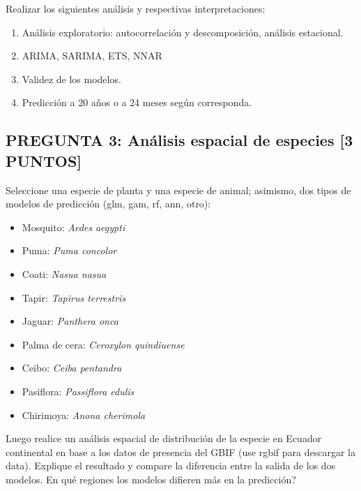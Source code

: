 \documentclass[
]{article}
\begin{document}
Realizar los siguientes análisis y respectivas interpretaciones:

\begin{enumerate}
\def\labelenumi{\arabic{enumi}.}
\item
  Análisis exploratorio: autocorrelación y descomposición, análisis
  estacional.
\item
  ARIMA, SARIMA, ETS, NNAR
\item
  Validez de los modelos.
\item
  Predicción a 20 años o a 24 meses según corresponda.
\end{enumerate}

\hypertarget{pregunta-3-anuxe1lisis-espacial-de-especies-3-puntos}{%
\subsection{\texorpdfstring{\textbf{PREGUNTA 3: Análisis espacial de
especies {[}3
PUNTOS{]}}}{PREGUNTA 3: Análisis espacial de especies {[}3 PUNTOS{]}}}\label{pregunta-3-anuxe1lisis-espacial-de-especies-3-puntos}}

Seleccione una especie de planta y una especie de animal; asimismo, dos
tipos de modelos de predicción (glm, gam, rf, ann, otro):

\begin{itemize}
\item
  Mosquito: \emph{Aedes aegypti}
\item
  Puma: \emph{Puma concolor}
\item
  Coati: \emph{Nasua nasua}
\item
  Tapir: \emph{Tapirus terrestris}
\item
  Jaguar: \emph{Panthera onca}
\item
  Palma de cera: \emph{Ceroxylon quindiuense}
\item
  Ceibo: \emph{Ceiba pentandra}
\item
  Pasiflora: \emph{Passiflora edulis}
\item
  Chirimoya: \emph{Anona cherimola}
\end{itemize}

Luego realice un análisis espacial de distribución de la especie en
Ecuador continental en base a los datos de presencia del GBIF (use rgbif
para descargar la data). Explique el resultado y compare la diferencia
entre la salida de los dos modelos. En qué regiones los modelos difieren
más en la predicción?
\end{document}
